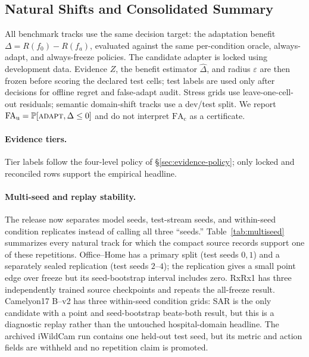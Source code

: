 \subsection{Natural Shifts and Consolidated Summary}\label{sec:nat-shift-headline}
All benchmark tracks use the same decision target: the adaptation benefit
$\Delta=R(f_0)-R(f_a)$, evaluated against the same per-condition oracle, always-adapt,
and always-freeze policies. The candidate adapter is locked using development data. Evidence
$Z$, the benefit estimator $\widehat\Delta$, and radius $\varepsilon$ are then frozen before
scoring the declared test cells; test labels are used only after decisions for offline regret and
false-adapt audit. Stress grids use leave-one-cell-out residuals; semantic domain-shift tracks use
a dev/test split. We report $\mathrm{FA}_{\mathrm u}=\Pr[\textsc{adapt},\Delta\le0]$ and do not
interpret $\mathrm{FA}_{\mathrm c}$ as a certificate.

\paragraph{Evidence tiers.}
Tier labels follow the four-level policy of \S\ref{sec:evidence-policy}; only locked and
reconciled rows support the empirical headline.


\paragraph{Multi-seed and replay stability.} The release now separates model seeds, test-stream
seeds, and within-seed condition replicates instead of calling all three ``seeds.''
Table~\ref{tab:multiseed} summarizes every natural track for which the compact source records support
one of these repetitions. Office--Home has a primary split (test seeds $0,1$) and a separately sealed
replication (test seeds $2$--$4$); the replication gives a small point edge over freeze but its
seed-bootstrap interval includes zero. RxRx1 has three independently trained source checkpoints and
repeats the all-freeze result. Camelyon17 B--v2 has three within-seed condition grids: SAR is the only
candidate with a point and seed-bootstrap beats-both result, but this is a diagnostic replay rather
than the untouched hospital-domain headline. The archived iWildCam run contains one held-out test
seed, but its metric and action fields are withheld and no repetition claim is promoted.

